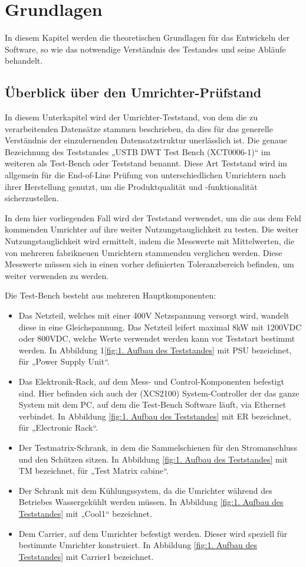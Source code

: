 
\newpage
\section{Grundlagen}
\label{Grundlagen}
In diesem Kapitel werden die theoretischen Grundlagen für das Entwickeln der Software,
so wie das notwendige Verständnis des Testandes und seine Abläufe behandelt.
\subsection{Überblick über den Umrichter-Prüfstand}
In diesem Unterkapitel wird der Umrichter-Teststand, von dem die zu verarbeitenden Datensätze stammen beschrieben,
da dies für das generelle Verständnis der einzulernenden Datensatzstruktur unerlässlich ist.
Die genaue Bezeichnung des Teststandes „USTB DWT Test Bench (XCT0006-1)“ im weiteren als Test-Bench oder Teststand benannt.
Diese Art Teststand wird im allgemein für die End-of-Line Prüfung von unterschiedlichen Umrichtern nach ihrer Herstellung genutzt,
um die Produktqualität und -funktionalität sicherzustellen.\cite*{Main_Manuel_USTB2018}

In dem hier vorliegenden Fall wird der Teststand verwendet, um die aus dem Feld kommenden Umrichter auf ihre weiter Nutzungstauglichkeit zu testen.
Die weiter Nutzungstauglichkeit wird ermittelt, indem die Messwerte mit Mittelwerten, die von mehreren fabrikneuen Umrichtern stammenden verglichen werden.
Diese Messwerte müssen sich in einen vorher definierten Toleranzbereich befinden, um weiter verwenden zu werden.

Die Test-Bench besteht aus mehreren Hauptkomponenten:
\begin{itemize}
\item Das Netzteil, welches mit einer 400V Netzspannung versorgt wird, wandelt diese in eine Gleichspannung. Das Netzteil leifert maximal 8kW mit 1200VDC oder 800VDC, welche Werte verwendet werden kann vor Teststart bestimmt werden. In Abbildung 1\ref{fig:1. Aufbau des Teststandes} mit PSU bezeichnet, für „Power Supply Unit“.
\item Das Elektronik-Rack, auf dem Mess- und Control-Komponenten befestigt sind. Hier befinden sich auch der (XCS2100) System-Controller der das ganze System mit dem PC, auf dem die Test-Bench Software läuft, via Ethernet verbindet. In Abbildung \ref{fig:1. Aufbau des Teststandes} mit ER bezeichnet, für „Electronic Rack“.
\item Der Testmatrix-Schrank, in dem die Sammelschienen für den Stromanschluss und den Schützen sitzen. In Abbildung \ref{fig:1. Aufbau des Teststandes} mit TM bezeichnet, für „Test Matrix cabine“.
\item Der Schrank mit dem Kühlungssystem, da die Umrichter während des Betriebes Wassergekühlt werden müssen. In Abbildung \ref{fig:1. Aufbau des Teststandes} mit „Cool1“ bezeichnet.
\item Dem Carrier, auf dem Umrichter befestigt werden. Dieser wird speziell für bestimmte Umrichter konstruiert. In Abbildung \ref{fig:1. Aufbau des Teststandes} mit Carrier1 bezeichnet.

\end{itemize}


